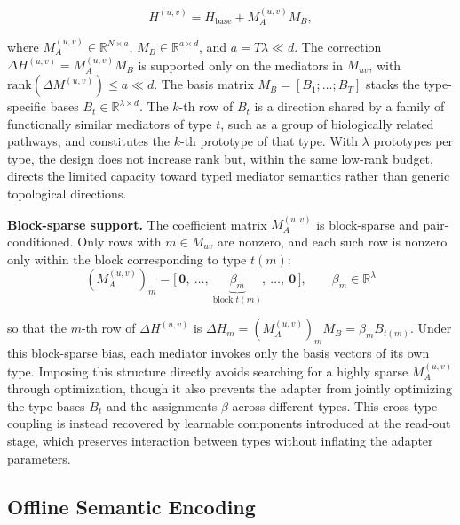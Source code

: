\documentclass[letterpaper]{article} %
\begin{document}
\begin{equation}
H^{(u,v)} = H_{\mathrm{base}} + M_A^{(u,v)} M_B,
\end{equation}

where $M_A^{(u,v)}\in\mathbb{R}^{N\times a}$, $M_B\in\mathbb{R}^{a\times d}$, and $a=T\lambda\ll d$. 
%
The correction $\Delta H^{(u,v)}=M_A^{(u,v)}M_B$ is supported only on the mediators in $M_{uv}$, with $\mathrm{rank}(\Delta M^{(u,v)})\le a\ll d$.
%
The basis matrix $M_B=[B_1;\dots;B_T]$ stacks the type-specific bases $B_t\in\mathbb{R}^{\lambda\times d}$. 
%
The $k$-th row of $B_t$ is a direction shared by a family of functionally similar mediators of type $t$, such as a group of biologically related pathways, and constitutes the $k$-th prototype of that type. 
%
With $\lambda$ prototypes per type, the design does not increase rank but, within the same low-rank budget, directs the limited capacity toward typed mediator semantics rather than generic topological directions.

\textbf{Block-sparse support.} The coefficient matrix $M_A^{(u,v)}$ is block-sparse and pair-conditioned. Only rows with $m\in M_{uv}$ are nonzero, and each such row is nonzero only within the block corresponding to type $t(m)$:
%
\begin{equation}
(M_A^{(u,v)})_m = \big[\,\mathbf{0},\ \dots,\ \underbrace{\beta_m}_{\text{block }t(m)},\ \dots,\ \mathbf{0}\,\big],\qquad \beta_m\in\mathbb{R}^\lambda
\end{equation}

\noindent so that the $m$-th row of $\Delta H^{(u,v)}$ is $\Delta H_m=(M_A^{(u,v)})_m M_B=\beta_m B_{t(m)}$. 
%
Under this block-sparse bias, each mediator invokes only the basis vectors of its own type.
%
Imposing this structure directly avoids searching for a highly sparse $M_A^{(u,v)}$ through optimization, though it also prevents the adapter from jointly optimizing the type bases $B_t$ and the assignments $\beta$ across different types. 
%
This cross-type coupling is instead recovered by learnable components introduced at the read-out stage, which preserves interaction between types without inflating the adapter parameters.


\subsection{Offline Semantic Encoding}
\end{document}
